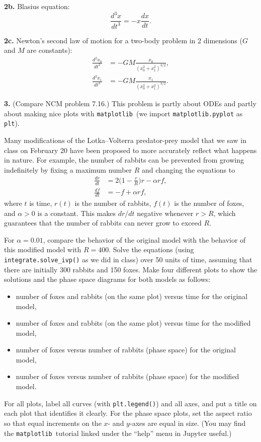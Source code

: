 \documentclass[11pt]{article}
\newcommand{\matplotlib}{{\tt matplotlib}}  %
\begin{document}
\par\bigskip
{\bf 2b.} Blasius equation:
$$ \frac{d^3 x}{dt^3} = -x\frac{dx}{dt}. $$

\par\bigskip
{\bf 2c.} Newton's second law of motion for a two-body problem in 2 dimensions 
($G$ and $M$ are constants):
\begin{align}
\frac{d^2 x_0}{dt^2} &= -GM\frac{x_0}{(x_0^2 + x_1^2)^{3/2}}, \\
\frac{d^2 x_1}{dt^2} &= -GM\frac{x_1}{(x_0^2 + x_1^2)^{3/2}}.
\end{align}

\par\bigskip
{\bf 3.} (Compare NCM problem 7.16.)
This problem is partly about ODEs and partly about making nice plots with
\matplotlib\ (we import {\tt matplotlib.pyplot} as {\tt plt}).

Many modifications of the Lotka--Volterra predator-prey model
that we saw in class on February 20 have been proposed to
more accurately reflect what happens in nature.
For example, the number of rabbits can be prevented from growing
indefinitely by fixing a maximum number $R$ and changing the equations to
\begin{align}
\frac{dr}{dt} &= 2\Big(1-\frac{r}{R}\Big)r - \alpha rf, \\
\frac{df}{dt} &= -f + \alpha rf,
\end{align}
where $t$ is time, $r(t)$ is the number of rabbits, 
$f(t)$ is the number of foxes, and $\alpha>0$ is a constant.
This makes $dr/dt$ negative whenever $r > R$, 
which guarantees that the number of rabbits can never grow to exceed $R$.

For $\alpha = 0.01$, compare the behavior of the original model
with the behavior of this modified model with $R = 400$.
Solve the equations (using {\tt integrate.solve\_ivp()} as we did in class)
over 50 units of time, 
assuming that there are initially 300 rabbits and 150 foxes.
Make four different plots to show the solutions and the phase
space diagrams for both models as follows:
\begin{itemize}
\item number of foxes and rabbits (on the same plot) versus time for the original model,
\item number of foxes and rabbits (on the same plot) versus time for the modified model,
\item number of foxes versus number of rabbits (phase space) for the original model,
\item number of foxes versus number of rabbits (phase space) for the modified model.
\end{itemize}
For all plots, label all curves (with {\tt plt.legend()}) and all axes,
and put a title on each plot that identifies it clearly.
For the phase space plots, set the aspect
ratio so that equal increments on the $x$- and $y$-axes are equal in size.
(You may find the \matplotlib\ tutorial linked under the ``help'' menu
in Jupyter useful.)
\end{document}
